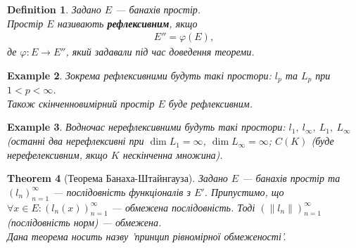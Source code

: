 \documentclass[a4paper, 10pt]{article}
\theoremstyle{theoremdd}
\newtheorem{theorem}{Theorem}[subsection]
\theoremstyle{theoremdd}
\newtheorem{definition}[theorem]{Definition}
\theoremstyle{theoremdd}
\theoremstyle{theoremdd}
\newtheorem{example}[theorem]{Example}
\theoremstyle{theoremdd}
\theoremstyle{theoremdd}
\theoremstyle{theoremdd}
\theoremstyle{theoremdd}
\begin{document}
\begin{definition}
Задано $E$ --- банахів простір.\\
Простір $E$ називають \textbf{рефлексивним}, якщо
\begin{align*}
E'' = \varphi(E),
\end{align*}
де $\varphi \colon E \to E''$, який задавали під час доведення теореми.
\end{definition}

\begin{example}
Зокрема рефлексивними будуть такі простори: $l_p$ та $L_p$ при $1 < p < \infty$.\\
Також скінченновимірний простір $E$ буде рефлексивним.
\end{example}

\begin{example}
Водночас нерефлексивними будуть такі простори: $l_1,\ l_\infty,\ L_1,\ L_\infty$ (останні два нерефлексивні при $\dim L_1 = \infty$, $\dim L_\infty = \infty$; $C(K)$ (буде нерефелексивним, якщо $K$ нескінченна множина).
\end{example}

\iffalse
\begin{theorem}[Теорема Банаха-Штайнгауза]
Задано $E$ --- банахів простір та $(l_n)_{n=1}^\infty$ --- послідовність функціоналів з $E'$. Припустимо, що $\forall x \in E: (l_n(x))_{n=1}^\infty$ --- обмежена послідовність. Тоді $(\|l_n\|)_{n=1}^\infty$ (послідовність норм) --- обмежена.\\
\textit{Дана теорема носить назву 'принцип рівномірної обмеженості'.}
\end{theorem}
\end{document}
